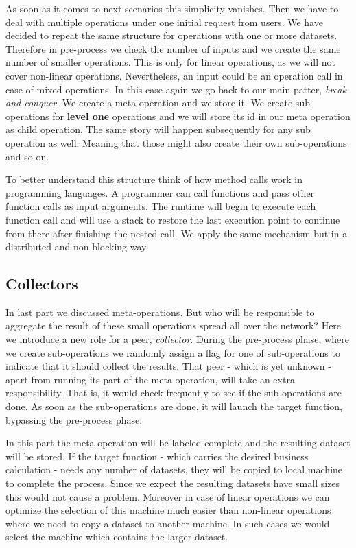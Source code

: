As soon as it comes to next scenarios this simplicity vanishes. 
Then we have to deal with multiple operations under one initial request from users.
We have decided to repeat the same structure for operations with one or more datasets.
Therefore in pre-process we check the number of inputs and we create the same number of
smaller operations. 
This is only for linear operations, as we will not cover non-linear operations.
Nevertheless, an input could be an operation call in case of mixed operations.
In this case again we go back to our main patter, \textit{break and conquer}. 
We create a meta operation and we store it. 
We create sub operations for \textbf{level one} operations and we will store its id 
in our meta operation as child operation. 
The same story will happen subsequently for any sub operation as well. 
Meaning that those might also create their own sub-operations and so on.

To better understand this structure think of how method calls work in programming languages.
A programmer can call functions and pass other function calls as input arguments.
The runtime will begin to execute each function call and will use a stack to restore
the last execution point to continue from there after finishing the nested call.
We apply the same mechanism but in a distributed and non-blocking way.

\subsection{Collectors}
In last part we discussed meta-operations. 
But who will be responsible to aggregate the result of these small operations spread all over the network? 
Here we introduce a new role for a peer, \textit{collector}. 
During the pre-process phase, where we create sub-operations we randomly assign
a flag for one of sub-operations to indicate that it should collect the results. 
That peer - which is yet unknown - apart from running its part of the meta operation,
will take an extra responsibility. That is, it would check frequently to see if the
sub-operations are done. As soon as the sub-operations are done, it will
launch the target function, bypassing the pre-process phase.

In this part the meta operation will be labeled complete and the resulting dataset will be stored.
If the target function - which carries the desired business calculation - needs any number of datasets,
they will be copied to local machine to complete the process. 
Since we expect the resulting datasets have small sizes this would not cause a problem. 
Moreover in case of linear operations we can optimize the selection of this machine much easier than
non-linear operations where we need to copy a dataset to another machine. 
In such cases we would select the machine which contains the larger dataset.


